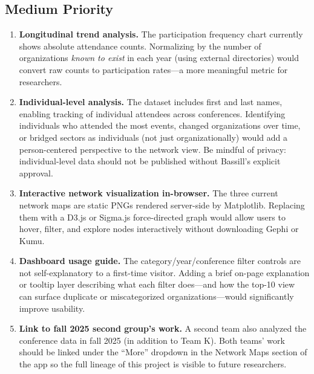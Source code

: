 \documentclass[12pt]{article}
\begin{document}
\subsection{Medium Priority}

\begin{enumerate}[leftmargin=1.5em]
  \item \textbf{Longitudinal trend analysis.}
        The participation frequency chart currently shows absolute attendance
        counts. Normalizing by the number of organizations \emph{known to
        exist} in each year (using external directories) would convert raw
        counts to participation rates---a more meaningful metric for
        researchers.

  \item \textbf{Individual-level analysis.}
        The dataset includes first and last names, enabling tracking of
        individual attendees across conferences. Identifying individuals who
        attended the most events, changed organizations over time, or bridged
        sectors as individuals (not just organizationally) would add a
        person-centered perspective to the network view. Be mindful of
        privacy: individual-level data should not be published without
        Bassill's explicit approval.

  \item \textbf{Interactive network visualization in-browser.}
        The three current network maps are static PNGs rendered server-side
        by Matplotlib. Replacing them with a D3.js or Sigma.js force-directed
        graph would allow users to hover, filter, and explore nodes
        interactively without downloading Gephi or Kumu.

  \item \textbf{Dashboard usage guide.}
        The category/year/conference filter controls are not self-explanatory
        to a first-time visitor. Adding a brief on-page explanation or tooltip
        layer describing what each filter does---and how the top-10 view can
        surface duplicate or miscategorized organizations---would significantly
        improve usability.

  \item \textbf{Link to fall 2025 second group's work.}
        A second team also analyzed the conference data in fall 2025 (in
        addition to Team K). Both teams' work should be linked under the
        ``More'' dropdown in the Network Maps section of the app so the full
        lineage of this project is visible to future researchers.


\end{enumerate}
\end{document}
